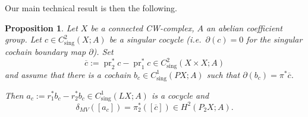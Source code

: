 \documentclass[a4paper,twoside]{article}
\theoremstyle{plain}
\newtheorem{proposition}[theorem]{Proposition}
\theoremstyle{definition}
\theoremstyle{remark}
\newcommand{\boundary}[1]{\partial#1}
\DeclareMathOperator{\sing}{sing}
\DeclareMathOperator{\pr}{pr}
\begin{document}
Our main technical result is then the following.
\begin{proposition}\label{prop:MV_cocycle}
  Let $X$ be a connected CW-complex, $A$ an abelian coefficient group. Let $c\in
  C^2_{\sing}(X;A)$ be a singular cocycle (i.e.~$\boundary(c)=0$ for the
  singular cochain boundary map $\partial$). Set
  \begin{equation*}
    \overline c:= \pr_2^*c-
    \pr_1^*c \in C^2_{\sing}(X\times X; A)
  \end{equation*}
  and assume that there is a cochain $b_c\in
  C^1_{\sing}(PX;A)$ such that $\partial(b_c) = \pi^*\overline c$.

  Then $a_c:= r_1^*b_c-r_2^*b_c\in C^1_{\sing}(LX;A)$ is a cocycle and
  \begin{equation*}
    \delta_{MV}([a_c]) = \pi_2^*([\overline c]) \in H^2(P_2X;A).
  \end{equation*}
\end{proposition}
\end{document}
